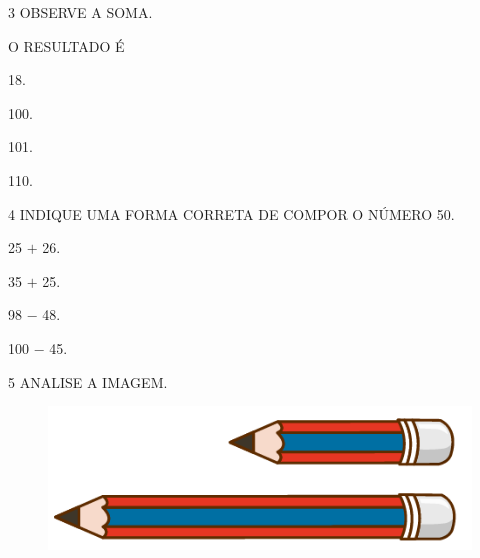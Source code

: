 \pagebreak

\num{3} OBSERVE A SOMA.\bigskip

\hspace*{\fill}\hspace*{\fill}

O RESULTADO É

\begin{escolha}[itemsep=0pt]
\item 18.

\item 100.

\item 101.

\item 110.
\end{escolha}

\num{4} INDIQUE UMA FORMA CORRETA DE COMPOR O NÚMERO 50.

\begin{escolha}[itemsep=0pt]
\item 25 $+$ 26.

\item 35 $+$ 25.

\item 98 $-$ 48.

\item 100 $-$ 45.
\end{escolha}

\num{5} ANALISE A IMAGEM.


\begin{figure}[htpb!]
\centering
\includegraphics[width=.5\textwidth]{./media/SAEB_1ANO_MAT_FIGURA113.png}
\end{figure}

